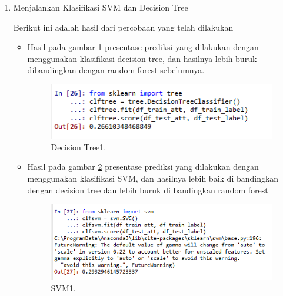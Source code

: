 \begin{enumerate}
\item Menjalankan Klasifikasi SVM dan Decision Tree \par
Berikut ini adalah hasil dari percobaan yang telah dilakukan
\begin{itemize}
\item Hasil pada gambar \ref{tree1} presentase prediksi yang dilakukan dengan menggunakan klasifikasi decision tree, dan hasilnya lebih buruk dibandingkan dengan random forest sebelumnya.
 		\begin{figure}[ht]
		\centerline{\includegraphics[width=1\textwidth]{figures/im/tree1.png}}
		\caption{Decision Tree1.}
		\label{tree1}
		\end{figure}

\item Hasil pada gambar \ref{svm1} presentase prediksi yang dilakukan dengan menggunakan klasifikasi SVM, dan hasilnya lebih baik di bandingkan dengan decision tree dan lebih buruk di bandingkan random forest
 		\begin{figure}[ht]
		\centerline{\includegraphics[width=1\textwidth]{figures/im/svm1.png}}
		\caption{SVM1.}
		\label{svm1}
		\end{figure}
\end{itemize}


\end{enumerate}
